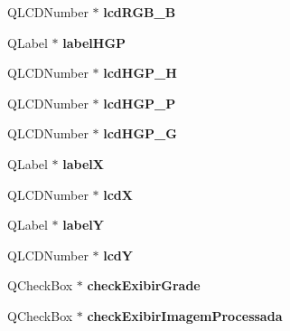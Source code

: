 \begin{DoxyCompactItemize}
\item 
Q\+L\+C\+D\+Number $\ast$ {\bfseries lcd\+R\+G\+B\+\_\+B}\hypertarget{classcalibrador_a927b14994d5fae0152cc3191102f3492}{}\label{classcalibrador_a927b14994d5fae0152cc3191102f3492}

\item 
Q\+Label $\ast$ {\bfseries label\+H\+GP}\hypertarget{classcalibrador_afc568e85d5da459532e91bf4956f8208}{}\label{classcalibrador_afc568e85d5da459532e91bf4956f8208}

\item 
Q\+L\+C\+D\+Number $\ast$ {\bfseries lcd\+H\+G\+P\+\_\+H}\hypertarget{classcalibrador_ac76fd6a8dd496d30d9cb4922078661f8}{}\label{classcalibrador_ac76fd6a8dd496d30d9cb4922078661f8}

\item 
Q\+L\+C\+D\+Number $\ast$ {\bfseries lcd\+H\+G\+P\+\_\+P}\hypertarget{classcalibrador_ad1975e664690fe70827e1eab45173d96}{}\label{classcalibrador_ad1975e664690fe70827e1eab45173d96}

\item 
Q\+L\+C\+D\+Number $\ast$ {\bfseries lcd\+H\+G\+P\+\_\+G}\hypertarget{classcalibrador_ae00a239bde5b7d102f441e706c1a3241}{}\label{classcalibrador_ae00a239bde5b7d102f441e706c1a3241}

\item 
Q\+Label $\ast$ {\bfseries labelX}\hypertarget{classcalibrador_a763054d53ed357cc49e24d62d096f4b1}{}\label{classcalibrador_a763054d53ed357cc49e24d62d096f4b1}

\item 
Q\+L\+C\+D\+Number $\ast$ {\bfseries lcdX}\hypertarget{classcalibrador_a94f5a0ff931c3f640fa16d79aa470ce1}{}\label{classcalibrador_a94f5a0ff931c3f640fa16d79aa470ce1}

\item 
Q\+Label $\ast$ {\bfseries labelY}\hypertarget{classcalibrador_a1bb0edb73e94627b9ed8ff15185ea333}{}\label{classcalibrador_a1bb0edb73e94627b9ed8ff15185ea333}

\item 
Q\+L\+C\+D\+Number $\ast$ {\bfseries lcdY}\hypertarget{classcalibrador_a1b09d6452589f8ac3ac20beebe188d95}{}\label{classcalibrador_a1b09d6452589f8ac3ac20beebe188d95}

\item 
Q\+Check\+Box $\ast$ {\bfseries check\+Exibir\+Grade}\hypertarget{classcalibrador_a966d85c93445a623458f6952f7743a9b}{}\label{classcalibrador_a966d85c93445a623458f6952f7743a9b}

\item 
Q\+Check\+Box $\ast$ {\bfseries check\+Exibir\+Imagem\+Processada}\hypertarget{classcalibrador_ae91ae8bcc8462409fcd5dc433b23d35b}{}\label{classcalibrador_ae91ae8bcc8462409fcd5dc433b23d35b}


\end{DoxyCompactItemize}
